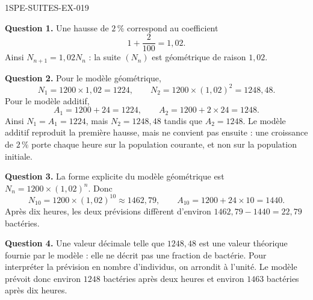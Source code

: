 \begin{corrige}{1SPE-SUITES-EX-019}


\textbf{Question 1.} Une hausse de $2\,\%$ correspond au coefficient
\[
1+\frac{2}{100}=1{,}02.
\]
Ainsi $N_{n+1}=1{,}02N_n$ : la suite $(N_n)$ est géométrique de raison
$1{,}02$.


\textbf{Question 2.} Pour le modèle géométrique,
\[
N_1=1200\times1{,}02=1224,
\qquad
N_2=1200\times(1{,}02)^2=1248{,}48.
\]
Pour le modèle additif,
\[
A_1=1200+24=1224,
\qquad
A_2=1200+2\times24=1248.
\]
Ainsi $N_1=A_1=1224$, mais $N_2=1248{,}48$ tandis que $A_2=1248$.
Le modèle additif reproduit la première hausse, mais ne convient pas ensuite :
une croissance de $2\,\%$ porte chaque heure sur la population courante, et non
sur la population initiale.


\textbf{Question 3.} La forme explicite du modèle géométrique est
$N_n=1200\times(1{,}02)^n$. Donc
\[
N_{10}=1200\times(1{,}02)^{10}\approx1462{,}79,
\qquad
A_{10}=1200+24\times10=1440.
\]
Après dix heures, les deux prévisions diffèrent d'environ
$1462{,}79-1440=22{,}79$ bactéries.


\textbf{Question 4.} Une valeur décimale telle que $1248{,}48$ est une valeur
théorique fournie par le modèle : elle ne décrit pas une fraction de bactérie.
Pour interpréter la prévision en nombre d'individus, on arrondit à l'unité. Le
modèle prévoit donc environ $1248$ bactéries après deux heures et environ $1463$
bactéries après dix heures.

\end{corrige}

